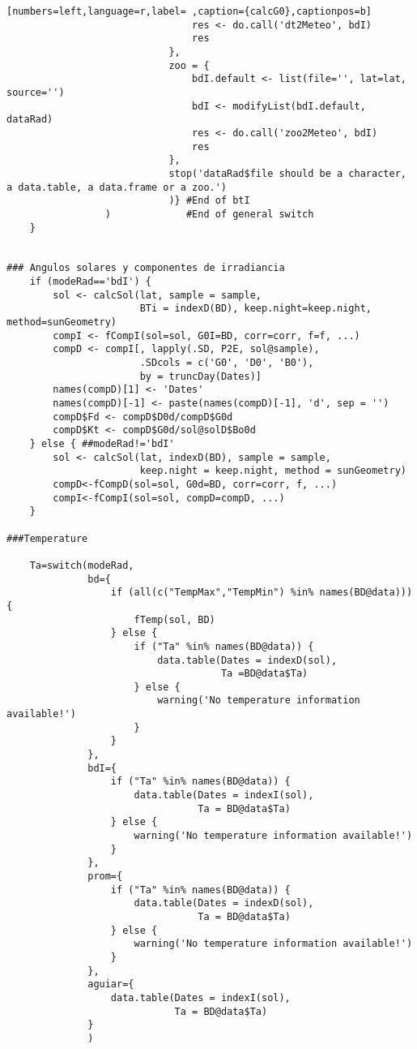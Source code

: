 \begin{lstlisting}[numbers=left,language=r,label= ,caption={calcG0},captionpos=b]
                                res <- do.call('dt2Meteo', bdI)
                                res
                            },
                            zoo = {
                                bdI.default <- list(file='', lat=lat, source='')
                                bdI <- modifyList(bdI.default, dataRad)
                                res <- do.call('zoo2Meteo', bdI)
                                res
                            },
                            stop('dataRad$file should be a character, a data.table, a data.frame or a zoo.')
                            )} #End of btI
                 )             #End of general switch    
    }


### Angulos solares y componentes de irradiancia
    if (modeRad=='bdI') {
        sol <- calcSol(lat, sample = sample,
                       BTi = indexD(BD), keep.night=keep.night, method=sunGeometry)
        compI <- fCompI(sol=sol, G0I=BD, corr=corr, f=f, ...)
        compD <- compI[, lapply(.SD, P2E, sol@sample),
                       .SDcols = c('G0', 'D0', 'B0'),
                       by = truncDay(Dates)]
        names(compD)[1] <- 'Dates'
        names(compD)[-1] <- paste(names(compD)[-1], 'd', sep = '')
        compD$Fd <- compD$D0d/compD$G0d
        compD$Kt <- compD$G0d/sol@solD$Bo0d
    } else { ##modeRad!='bdI'
        sol <- calcSol(lat, indexD(BD), sample = sample,
                       keep.night = keep.night, method = sunGeometry)
        compD<-fCompD(sol=sol, G0d=BD, corr=corr, f, ...)
        compI<-fCompI(sol=sol, compD=compD, ...)
    }

###Temperature

    Ta=switch(modeRad,
              bd={
                  if (all(c("TempMax","TempMin") %in% names(BD@data))) {
                      fTemp(sol, BD)
                  } else {
                      if ("Ta" %in% names(BD@data)) {
                          data.table(Dates = indexD(sol),
                                     Ta =BD@data$Ta)
                      } else {
                          warning('No temperature information available!')
                      }
                  }
              },
              bdI={
                  if ("Ta" %in% names(BD@data)) {
                      data.table(Dates = indexI(sol),
                                 Ta = BD@data$Ta)
                  } else {
                      warning('No temperature information available!')
                  }
              },
              prom={
                  if ("Ta" %in% names(BD@data)) {
                      data.table(Dates = indexD(sol),
                                 Ta = BD@data$Ta)
                  } else {
                      warning('No temperature information available!')
                  }                  
              },
              aguiar={ 
                  data.table(Dates = indexI(sol),
                             Ta = BD@data$Ta)
              }
              )


\end{lstlisting}
